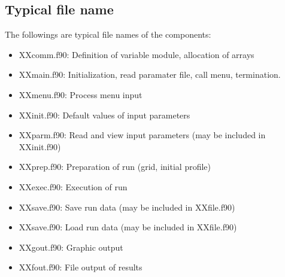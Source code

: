 \documentclass[11pt]{article}
\begin{document}
\subsection{Typical file name}

The followings are typical file names of the components:

\begin{itemize}
\item[] XXcomm.f90: Definition of variable module, allocation of
  arrays
\item[] XXmain.f90: Initialization, read paramater file, call menu, termination.
\item[] XXmenu.f90: Process menu input
\item[] XXinit.f90: Default values of input parameters
\item[] XXparm.f90: Read and view input parameters (may be included in XXinit.f90)
\item[] XXprep.f90: Preparation of run (grid, initial profile)
\item[] XXexec.f90: Execution of run
\item[] XXsave.f90: Save run data (may be included in XXfile.f90)
\item[] XXsave.f90: Load run data (may be included in XXfile.f90)
\item[] XXgout.f90: Graphic output
\item[] XXfout.f90: File output of results
\end{itemize}
\end{document}
